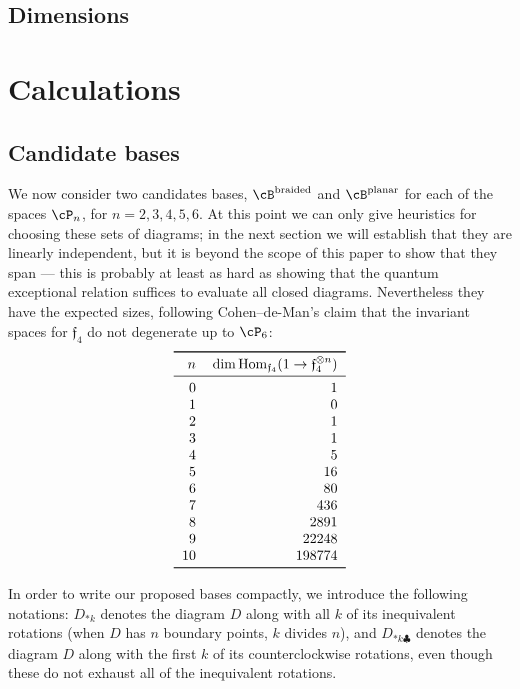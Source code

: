 \documentclass[12pt]{amsart}
\begin{document}
\subsection{Dimensions}

\section{Calculations}
\label{sec:calculations}
\newcommand{\V}{\mathcal{P}}

\subsection{Candidate bases}
\label{sec:bases}
We now consider two candidates bases, $\cB^{\text{braided}}$ and $\cB^{\text
{planar}}$ for each of the spaces $\cP_n$, for $n = 2,3,4,5,6$.
At this point we can only give heuristics for choosing these sets of diagrams;
in the next section we will establish that they are linearly independent, but
it is beyond the scope of this paper to show that they span --- this is
probably at least as hard as showing that the quantum exceptional relation
suffices to evaluate all closed diagrams. Nevertheless they have the expected
sizes, following Cohen--de-Man's claim that the invariant spaces for
$\mathfrak{f}_4$ do not degenerate up to $\cP_6$:
\[
\begin{tabular}{rr}
  \toprule
  $n$ & $\dim \Hom_{\mathfrak{f}_4} (1 \to \mathfrak{f}_4^{\otimes n})$ \\
  \midrule
  0 & 1 \\ 1 & 0 \\ 2 & 1 \\ 3 & 1 \\ 4 & 5 \\ 5 & 16 \\
  6 & 80 \\ 7 & 436 \\ 8 & 2891 \\ 9 & 22248 \\ 10 & 198774 \\
  \bottomrule
\end{tabular}
\]

\newcommand{\diagram}[2]{\mathfig{#1}{graphs/urn_sha1_#2.pdf}}

In order to write our proposed bases compactly, we introduce the following
notations: $D_{*k}$ denotes the diagram $D$ along with all $k$ of its
inequivalent rotations (when $D$ has $n$ boundary points, $k$ divides $n$),
and $D_{*k \clubsuit}$ denotes the diagram $D$ along with the first $k$ of its
counterclockwise rotations, even though these do not exhaust all of the
inequivalent rotations.
\end{document}
